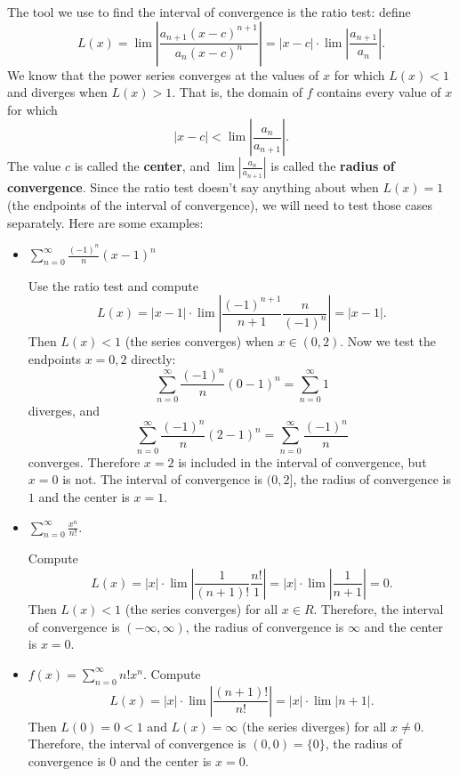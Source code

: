 The tool we use to find the interval of convergence is the ratio test: define
$$L(x)=\lim \left|\frac{a_{n+1}(x-c)^{n+1}}{a_{n}(x-c)^n}\right|=|x-c|\cdot\lim \left|\frac{a_{n+1}}{a_{n}}\right|.$$
We know that the power series converges at the values of $x$ for which $L(x) < 1$ and diverges when $L(x) > 1$. That is, the domain of $f$ contains every value of $x$ for which
$$|x-c|<\lim\left|\frac{a_{n}}{a_{n+1}}\right|.$$
The value $c$ is called the \textbf{center}, and $\lim\left|\frac{a_{n}}{a_{n+1}}\right|$ is called the \textbf{radius of convergence}. Since the ratio test doesn't say anything about when $L(x)=1$ (the endpoints of the interval of convergence), we will need to test those cases separately. Here are some examples:
\begin{itemize}[leftmargin=0em]
\item $\displaystyle\sum_{n=0}^\infty \frac{(-1)^n}{n}(x-1)^n$

Use the ratio test and compute
$$L(x)=|x-1|\cdot\lim\left|\frac{(-1)^{n+1}}{n+1}\frac{n}{(-1)^n}\right|=|x-1|.$$
Then $L(x)<1$ (the series converges) when $x\in (0, 2)$. Now we test the endpoints $x=0,2$ directly:
$$\sum_{n=0}^\infty \frac{(-1)^n}{n}(0-1)^n=\sum_{n=0}^\infty1$$
diverges, and
$$\sum_{n=0}^\infty \frac{(-1)^n}{n}(2-1)^n=\sum_{n=0}^\infty \frac{(-1)^n}{n}$$
converges. Therefore $x=2$ is included in the interval of convergence, but $x=0$ is not. The interval of convergence is $(0,2]$, the radius of convergence is $1$ and the center is $x=1$.

\item $\displaystyle\sum_{n=0}^\infty \frac{x^n}{n!}$.

Compute
$$L(x)=|x|\cdot\lim\left|\frac{1}{(n+1)!}\frac{n!}{1}\right|=|x|\cdot\lim\left|\frac{1}{n+1}\right|=0.$$
Then $L(x)<1$ (the series converges) for all $x\in R$. Therefore, the interval of convergence is $(-\infty,\infty)$, the radius of convergence is $\infty$ and the center is $x=0$.

\item $f(x)=\displaystyle\sum_{n=0}^\infty n! x^n$.
Compute
$$L(x)=|x|\cdot\lim\left|\frac{(n+1)!}{n!}\right|=|x|\cdot\lim\left|n+1\right|.$$
Then $L(0)=0<1$ and $L(x)=\infty$ (the series diverges) for all $x\neq 0$. Therefore, the interval of convergence is $(0,0)=\{0\}$, the radius of convergence is $0$ and the center is $x=0$.


\end{itemize}



